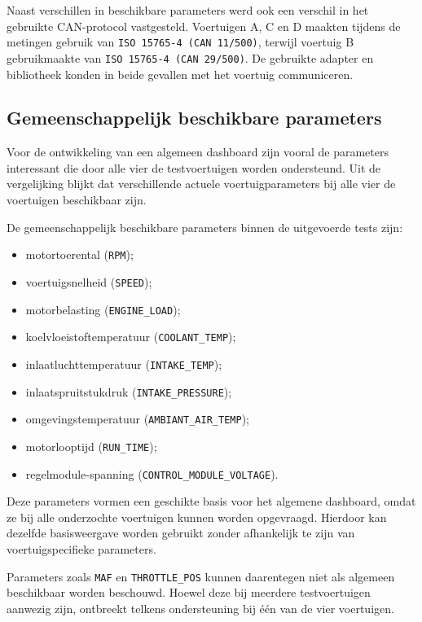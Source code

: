 Naast verschillen in beschikbare parameters werd ook een verschil in het
gebruikte CAN-protocol vastgesteld. Voertuigen A, C en D maakten tijdens de
metingen gebruik van \texttt{ISO 15765-4 (CAN 11/500)}, terwijl voertuig B
gebruikmaakte van \texttt{ISO 15765-4 (CAN 29/500)}. De gebruikte adapter en
bibliotheek konden in beide gevallen met het voertuig communiceren.

\subsection{Gemeenschappelijk beschikbare parameters}
Voor de ontwikkeling van een algemeen dashboard zijn vooral de parameters
interessant die door alle vier de testvoertuigen worden ondersteund. Uit de
vergelijking blijkt dat verschillende actuele voertuigparameters bij alle vier
de voertuigen beschikbaar zijn.

De gemeenschappelijk beschikbare parameters binnen de uitgevoerde tests zijn:

\begin{itemize}
    \item motortoerental (\texttt{RPM});
    \item voertuigsnelheid (\texttt{SPEED});
    \item motorbelasting (\texttt{ENGINE\_LOAD});
    \item koelvloeistoftemperatuur (\texttt{COOLANT\_TEMP});
    \item inlaatluchttemperatuur (\texttt{INTAKE\_TEMP});
    \item inlaatspruitstukdruk (\texttt{INTAKE\_PRESSURE});
    \item omgevingstemperatuur (\texttt{AMBIANT\_AIR\_TEMP});
    \item motorlooptijd (\texttt{RUN\_TIME});
    \item regelmodule-spanning (\texttt{CONTROL\_MODULE\_VOLTAGE}).
\end{itemize}

Deze parameters vormen een geschikte basis voor het algemene dashboard, omdat
ze bij alle onderzochte voertuigen kunnen worden opgevraagd. Hierdoor kan
dezelfde basisweergave worden gebruikt zonder afhankelijk te zijn van
voertuigspecifieke parameters.

Parameters zoals \texttt{MAF} en \texttt{THROTTLE\_POS} kunnen daarentegen
niet als algemeen beschikbaar worden beschouwd. Hoewel deze bij meerdere
testvoertuigen aanwezig zijn, ontbreekt telkens ondersteuning bij één van de
vier voertuigen.

